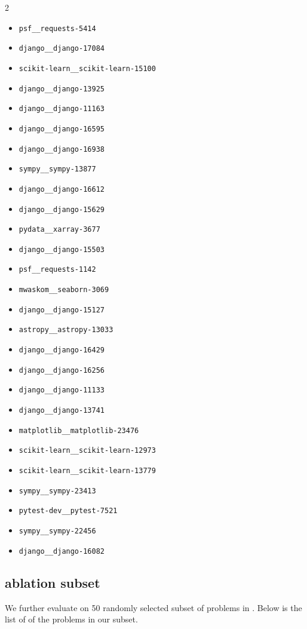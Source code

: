 \begin{multicols}{2}
\begin{itemize}
\item \texttt{psf\_\_requests-5414}
\item \texttt{django\_\_django-17084}
\item \texttt{scikit-learn\_\_scikit-learn-15100}
\item \texttt{django\_\_django-13925}
\item \texttt{django\_\_django-11163}
\item \texttt{django\_\_django-16595}
\item \texttt{django\_\_django-16938}
\item \texttt{sympy\_\_sympy-13877}
\item \texttt{django\_\_django-16612}
\item \texttt{django\_\_django-15629}
\item \texttt{pydata\_\_xarray-3677}
\item \texttt{django\_\_django-15503}
\item \texttt{psf\_\_requests-1142}
\item \texttt{mwaskom\_\_seaborn-3069}
\item \texttt{django\_\_django-15127}
\item \texttt{astropy\_\_astropy-13033}
\item \texttt{django\_\_django-16429}
\item \texttt{django\_\_django-16256}
\item \texttt{django\_\_django-11133}
\item \texttt{django\_\_django-13741}
\item \texttt{matplotlib\_\_matplotlib-23476}
\item \texttt{scikit-learn\_\_scikit-learn-12973}
\item \texttt{scikit-learn\_\_scikit-learn-13779}
\item \texttt{sympy\_\_sympy-23413}
\item \texttt{pytest-dev\_\_pytest-7521}
\item \texttt{sympy\_\_sympy-22456}
\item \texttt{django\_\_django-16082}
\end{itemize}
\end{multicols}


\subsection{\swebenchmultilingual ablation subset}
\label{appendix:multilingal_subset}

We further evaluate on 50 randomly selected subset of problems in \swebenchmultilingual. 
Below is the list of  of the problems in our subset.

